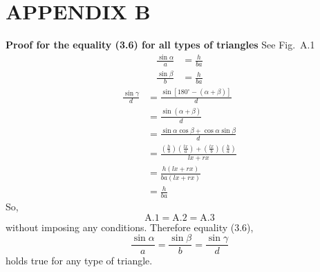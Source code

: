 \documentclass[12pt]{report}
\begin{document}
\section*{APPENDIX B} \textbf{Proof for the equality (3.6) for all types of triangles} \vspace{0.5cm} See Fig.~A.1 \begin{align} \frac{\sin\alpha}{a} &= \frac{h}{ba} \tag{A.1} \\[4mm] \frac{\sin\beta}{b} &= \frac{h}{ba} \tag{A.2} \end{align} \begin{align} \frac{\sin\gamma}{d} &= \frac{\sin[180^\circ-(\alpha+\beta)]}{d} \\[2mm] &= \frac{\sin(\alpha+\beta)}{d} \\[2mm] &= \frac{\sin\alpha\cos\beta+\cos\alpha\sin\beta}{d} \\[2mm] &= \frac{\left(\frac{h}{b}\right)\left(\frac{lx}{a}\right) + \left(\frac{lx}{b}\right)\left(\frac{h}{a}\right)} {lx+rx} \\[2mm] &= \frac{h(lx+rx)} {ba(lx+rx)} \\[2mm] &= \frac{h}{ba} \tag{A.3} \end{align} So, \[ \text{A.1} = \text{A.2} = \text{A.3} \] without imposing any conditions. Therefore equality (3.6), \begin{equation} \frac{\sin\alpha}{a} = \frac{\sin\beta}{b} = \frac{\sin\gamma}{d} \tag{3.6} \end{equation} holds true for any type of triangle.
\end{document}
